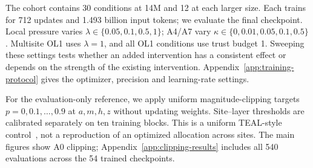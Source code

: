 The cohort contains 30 conditions at 14M and 12 at each larger size.
Each trains for 712 updates and 1.493 billion
input tokens; we evaluate the final checkpoint. Local pressure varies
$\lambda\in\{0.05,0.1,0.5,1\}$; A4/A7 vary
$\kappa\in\{0,0.01,0.05,0.1,0.5\}$. Multisite OL1 uses $\lambda=1$,
and all OL1 conditions use trust budget 1. Sweeping these settings tests
whether an added intervention has a consistent effect or depends on the
strength of the existing intervention. Appendix~\ref{app:training-protocol} gives the
optimizer, precision and learning-rate settings.

For the evaluation-only reference, we apply uniform magnitude-clipping targets
$p=0,0.1,\ldots,0.9$ at $a,m,h,z$ without updating weights. Site--layer
thresholds are calibrated separately on ten training blocks. This is a
uniform TEAL-style control~\citep{liu2024teal}, not a reproduction of an
optimized allocation across sites. The main figures show A0 clipping;
Appendix~\ref{app:clipping-results} includes all 540 evaluations across the
54 trained checkpoints.



